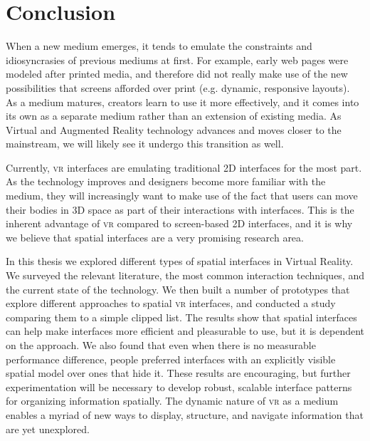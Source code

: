 \documentclass[nobib]{tufte-book} %
\begin{document}

\chapter{Conclusion}
\label{ch:conclusion}

When a new medium emerges, it tends to emulate the constraints and idiosyncrasies of previous mediums at first. For example, early web pages were modeled after printed media, and therefore did not really make use of the new possibilities that screens afforded over print (e.g. dynamic, responsive layouts). As a medium matures, creators learn to use it more effectively, and it comes into its own as a separate medium rather than an extension of existing media. As Virtual and Augmented Reality technology advances and moves closer to the mainstream, we will likely see it undergo this transition as well.

Currently, \textsc{vr} interfaces are emulating traditional 2D interfaces for the most part. As the technology improves and designers become more familiar with the medium, they will increasingly want to make use of the fact that users can move their bodies in 3D space as part of their interactions with interfaces. This is the inherent advantage of \textsc{vr} compared to screen-based 2D interfaces, and it is why we believe that spatial interfaces are a very promising research area.

In this thesis we explored different types of spatial interfaces in Virtual Reality. We surveyed the relevant literature, the most common interaction techniques, and the current state of the technology. We then built a number of prototypes that explore different approaches to spatial \textsc{vr} interfaces, and conducted a study comparing them to a simple clipped list. The results show that spatial interfaces can help make interfaces more efficient and pleasurable to use, but it is dependent on the approach. We also found that even when there is no measurable performance difference, people preferred interfaces with an explicitly visible spatial model over ones that hide it. These results are encouraging, but further experimentation will be necessary to develop robust, scalable interface patterns for organizing information spatially. The dynamic nature of \textsc{vr} as a medium enables a myriad of new ways to display, structure, and navigate information that are yet unexplored.
\end{document}
